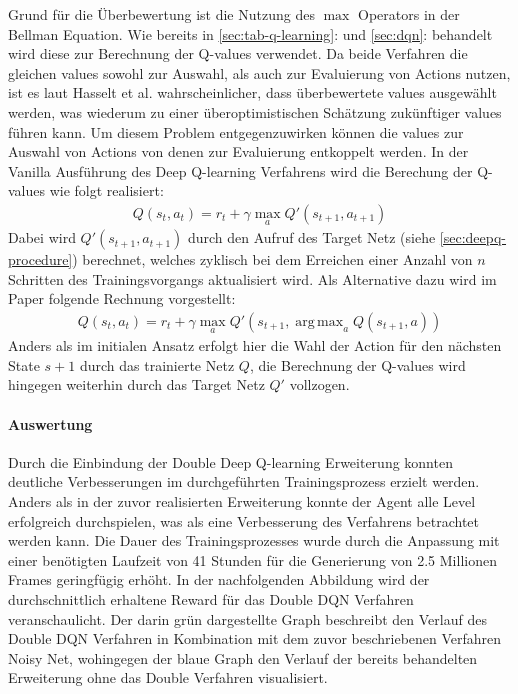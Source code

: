 \documentclass[11pt]{scrartcl}
\DeclareMathOperator*{\argmax}{arg\,max}
\begin{document}
Grund für die Überbewertung ist die Nutzung des $\max$ Operators in der Bellman Equation.
Wie bereits in \autoref{sec:tab-q-learning}: und \autoref{sec:dqn}:
 behandelt wird diese zur Berechnung der Q-values verwendet. Da beide
Verfahren die gleichen values sowohl zur Auswahl, als auch zur Evaluierung von Actions nutzen,
ist es laut Hasselt et al.\cite[~S.2]{HGD2015} wahrscheinlicher, dass überbewertete values
ausgewählt werden, was wiederum zu einer überoptimistischen Schätzung zu\-künf\-ti\-ger values
führen kann. Um diesem Problem entgegenzuwirken können die values zur Auswahl von Actions von
denen zur Evaluierung entkoppelt werden. In der Vanilla Ausführung des Deep Q-learning
Verfahrens wird die Berechung der Q-values wie folgt realisiert:
\begin{align}
Q(s_t, a_t) = r_t + \gamma\max_{a}Q'(s_{t+1},a_{t+1})
\label{aln:double-dqn-q-values}
\end{align}
Dabei wird $Q'(s_{t+1}, a_{t+1})$ durch den Aufruf des Target Netz (siehe 
\autoref{sec:deepq-procedure}) berechnet, welches zyklisch bei dem Erreichen einer Anzahl von
$n$ Schritten des Trainingsvorgangs aktualisiert wird. Als Alternative dazu wird im Paper
folgende Rechnung vorgestellt:
\begin{align}
Q(s_t, a_t) = r_t + \gamma\max_{a}Q'(s_{t+1},\argmax_{a}Q(s_{t+1},a))
\label{aln:double-dqn-q-values-improved}
\end{align}
Anders als im initialen Ansatz erfolgt hier die Wahl der Action für den nächsten State $s+1$
durch das trainierte Netz $Q$, die Berechnung der Q-values wird hingegen weiterhin durch das
Target Netz $Q'$ vollzogen.

\paragraph*{Auswertung}
\noindent
\newline
Durch die Einbindung der Double Deep Q-learning Erweiterung konnten deutliche
Verbesserungen im durchgeführten Trainingsprozess erzielt werden. Anders als in der zuvor
realisierten Erweiterung konnte der Agent alle Level erfolgreich durchspielen, was als
eine Verbesserung des Verfahrens betrachtet werden kann. Die Dauer des Trainingsprozesses
wurde durch die Anpassung mit einer benötigten Laufzeit von 41 Stunden für die Generierung
von 2.5 Millionen Frames geringfügig erhöht. In der nachfolgenden Abbildung wird der
durchschnittlich erhaltene Reward für das Double DQN Verfahren veranschaulicht. Der darin
grün dargestellte Graph beschreibt den Verlauf des Double DQN Verfahren in Kombination
mit dem zuvor beschriebenen Verfahren Noisy Net, wohingegen der blaue Graph den Verlauf
der bereits behandelten Erweiterung ohne das Double Verfahren visualisiert.
\end{document}
